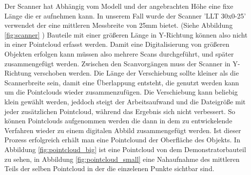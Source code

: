 \documentclass[../main.tex]{subfiles}
\begin{document}
Der Scanner hat Abhängig vom Modell und der angebrachten Höhe eine fixe Länge die 
er aufnehmen kann. In unserem Fall wurde der Scanner 'LLT 30x0-25' verwendet der 
eine mittleren Messbreite von 25mm bietet. 
(Siehe Abbildung \ref{fig:scanner} \cite{MESSTECHNIK_2020}) 
Bauteile mit einer größeren Länge in Y-Richtung können also nicht in einer Pointcloud
erfasst werden. Damit eine Digitalisierung von größeren Objekten erfolgen kann müssen
also mehrere Scans durchgeführt, und später zusammengefügt werden. Zwischen den 
Scanvorgängen muss der Scanner in Y-Richtung verschoben werden.
Die Länge der Verschiebung sollte 
kleiner als die Scannerbreite sein, damit eine Überlappung entsteht, die 
genutzt werden kann um die Pointclouds wieder zusammenzufügen. Die Verschiebung kann 
beliebig klein gewählt werden, jeddoch steigt der Arbeitsaufwand und die Dateigröße mit 
jeder zusätzlichen Pointcloud, während das Ergebnis sich nicht verbessert.
So können Pointclouds aufgenommen werden die dann in dem zu entwickelende Verfahren
wieder zu einem digitalen Abbild zusammengefügt werden. Ist dieser Prozess erfolgreich
erhält man eine Pointclound der Oberfläche des Objekts. 
In Abbildung \ref{fig:pointcloud_big} ist eine Pointcloud von dem Demonstratorbauteil
zu sehen, in Abbildung \ref{fig:pointcloud_small} eine Nahaufnahme des mittleren Teils
der selben Pointcloud in der die einzelenen Punkte sichtbar sind.
\end{document}
